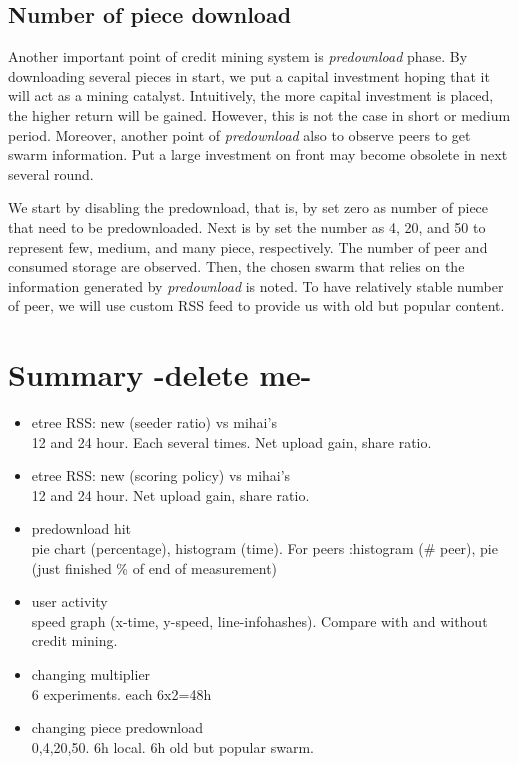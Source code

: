 \subsection{Number of piece download}
Another important point of credit mining system is \textit{predownload} phase. By downloading several pieces in start, we put a capital investment hoping that it will act as a mining catalyst. Intuitively, the more capital investment is placed, the higher return will be gained. However, this is not the case in short or medium period. Moreover, another point of \textit{predownload} also to observe peers to get swarm information. Put a large investment on front may become obsolete in next several round.

We start by disabling the predownload, that is, by set zero as number of piece that need to be predownloaded. Next is by set the number as 4, 20, and 50 to represent few, medium, and many piece, respectively. The number of peer and consumed storage are observed. Then, the chosen swarm that relies on the information generated by \textit{predownload} is noted. To have relatively stable number of peer, we will use custom RSS feed to provide us with old but popular content. 

\newpage
\section{Summary -delete me-}
\begin{itemize}
	\item etree RSS: new (seeder ratio) vs mihai's \\
	12 and 24 hour. Each several times. Net upload gain, share ratio.
	\item etree RSS: new (scoring policy) vs mihai's\\
	12 and 24 hour. Net upload gain, share ratio.
	\item predownload hit\\
	pie chart (percentage), histogram (time). For peers :histogram (\# peer), pie (just finished \% of end of measurement)
	\item user activity\\
	speed graph (x-time, y-speed, line-infohashes). Compare with and without credit mining.
	\item changing multiplier\\
	6 experiments. each 6x2=48h
	\item changing piece predownload\\
	0,4,20,50. 6h local. 6h old but popular swarm.
\end{itemize}
